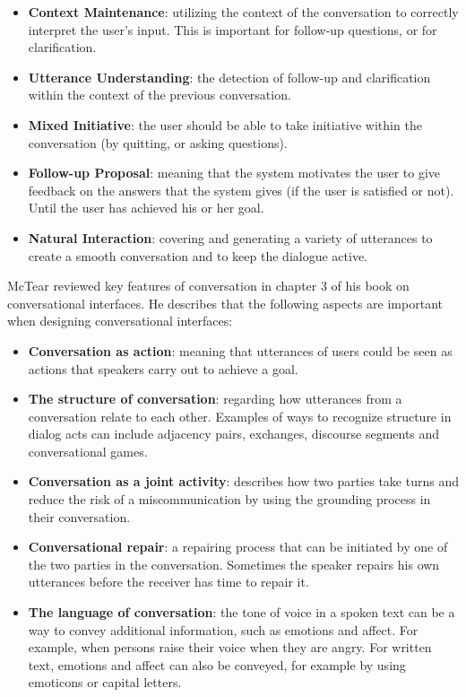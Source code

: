 \begin{itemize}
\item \textbf{Context Maintenance}: utilizing the context of the conversation to correctly interpret the user’s input. This is important for follow-up questions, or for clarification.
% 
% 
\item \textbf{Utterance Understanding}: the detection of follow-up and clarification within the context of the previous conversation.
\item \textbf{Mixed Initiative}: the user should be able to take initiative within the conversation (by quitting, or asking questions).
\item \textbf{Follow-up Proposal}: meaning that the system motivates the user to give feedback on the answers that the system gives (if the user is satisfied or not). Until the user has achieved his or her goal.
\item \textbf{Natural Interaction}: covering and generating a variety of utterances to create a smooth conversation and to keep the dialogue active.
\end{itemize}

McTear \cite{mctear2016} reviewed key features of conversation in chapter 3 of his book on conversational interfaces. He describes that the following aspects are important when designing conversational interfaces:

\begin{itemize}
\item \textbf{Conversation as action}: meaning that utterances of users could be seen as actions that speakers carry out to achieve a goal.
\item \textbf{The structure of conversation}: regarding how utterances from a conversation relate to each other. Examples of ways to recognize structure in dialog acts can include adjacency pairs, exchanges, discourse segments and conversational games.
\item \textbf{Conversation as a joint activity}: describes how two parties take turns and reduce the risk of a miscommunication by using the grounding process in their conversation.
\item \textbf{Conversational repair}: a repairing process that can be initiated by one of the two parties in the conversation. Sometimes the speaker repairs his own utterances before the receiver has time to repair it.
\item \textbf{The language of conversation}: the tone of voice in a spoken text can be a way to convey additional information, such as emotions and affect. For example, when persons raise their voice when they are angry. For written text, emotions and affect can also be conveyed, for example by using emoticons or capital letters.
\end{itemize}

